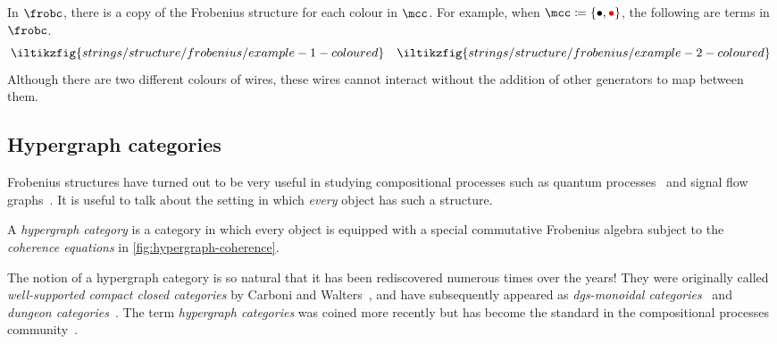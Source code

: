 \begin{example}
    In \(\frobc\), there is a copy of the Frobenius structure for each colour
    in \(\mcc\).
    For example, when \(\mcc \coloneqq \{\bullet,\redbullet\}\), the following
    are terms in \(\frobc\).
    \[
        \iltikzfig{strings/structure/frobenius/example-1-coloured}
        \quad
        \iltikzfig{strings/structure/frobenius/example-2-coloured}
    \]
    Although there are two different colours of wires, these wires cannot
    interact without the addition of other generators to map between them.
\end{example}


\subsection{Hypergraph categories}

Frobenius structures have turned out to be very useful in studying compositional
processes such as quantum processes~\cite{coecke2008interacting} and signal flow
graphs~\cite{bonchi2014categorical,bonchi2015full}.
It is useful to talk about the setting in which \emph{every} object has such a
structure.

\begin{definition}
    \label{def:hypergraph-category}
    A \emph{hypergraph category} is a category in which every object is equipped
    with a special commutative Frobenius algebra subject to the
    \emph{coherence equations} in \cref{fig:hypergraph-coherence}.
\end{definition}



\begin{remark}
    The notion of a hypergraph category is so natural that it has been
    rediscovered numerous times over the years!
    They were originally called \emph{well-supported compact closed categories}
    by Carboni and Walters~\cite{carboni1987cartesian}, and have subsequently
    appeared as
    \emph{dgs-monoidal categories}~\cite{katis1997bicategories,gadducci1998inductive,gadducci1999bicategorical,bruni2002normal}
    and \emph{dungeon categories}~\cite{morton2014belief}.
    The term \emph{hypergraph categories} was coined more recently but has
    become the standard in the compositional processes
    community~\cite{kissinger2015finite,fong2015decorated,baez2016compositional,baez2018compositional}.
\end{remark}

